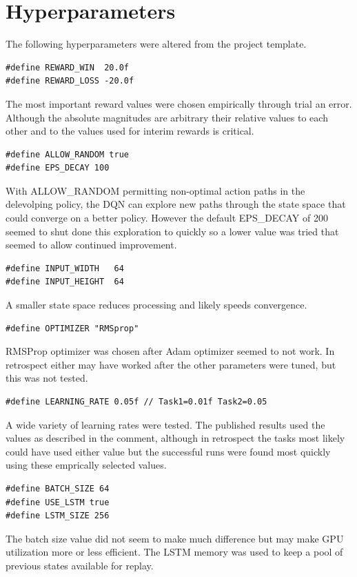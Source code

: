\documentclass[10pt]{article}
\begin{document}
 
\section{Hyperparameters}
The following hyperparameters were altered from the project template. 

\begin{lstlisting}
#define REWARD_WIN  20.0f
#define REWARD_LOSS -20.0f
\end{lstlisting}
The most important reward values were chosen empirically through trial an error. Although the absolute magnitudes are arbitrary
their relative values to each other and to the values used for interim rewards is critical.

\begin{lstlisting}
#define ALLOW_RANDOM true
#define EPS_DECAY 100
\end{lstlisting}
With ALLOW\_RANDOM permitting non-optimal action paths in the delevolping policy, the DQN can explore new paths through the state
space that could converge on a better policy. However the default EPS\_DECAY of 200 seemed to shut done this exploration to quickly
so a lower value was tried that seemed to allow continued improvement.

\begin{lstlisting}
#define INPUT_WIDTH   64
#define INPUT_HEIGHT  64
\end{lstlisting}
A smaller state space reduces processing and likely speeds convergence.
\begin{lstlisting}
#define OPTIMIZER "RMSprop"
\end{lstlisting}
RMSProp optimizer was chosen after Adam optimizer seemed to not work. In retrospect either may have worked after the other
parameters were tuned, but this was not tested.

\begin{lstlisting}
#define LEARNING_RATE 0.05f // Task1=0.01f Task2=0.05
\end{lstlisting}
A wide variety of learning rates were tested. The published results used the values as described in the comment, although in retrospect the tasks
most likely could have used either value but the successful runs were found most quickly using these emprically selected values. 

\begin{lstlisting}
#define BATCH_SIZE 64
#define USE_LSTM true
#define LSTM_SIZE 256
\end{lstlisting}
The batch size value did not seem to make much difference but may make GPU utilization more or less efficient. The LSTM memory was used
to keep a pool of previous states available for replay.
\end{document}
